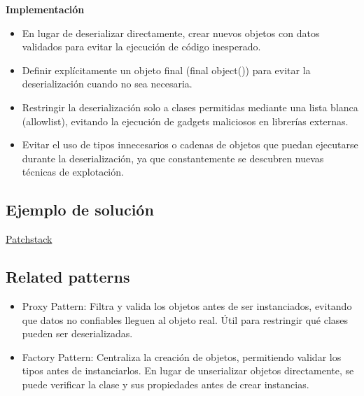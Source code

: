 \textbf{Implementación}
\begin{itemize}
\item En lugar de deserializar directamente, crear nuevos objetos con datos validados para evitar la ejecución de código inesperado.
\item Definir explícitamente un objeto final (final object()) para evitar la deserialización cuando no sea necesaria.
\item Restringir la deserialización solo a clases permitidas mediante una lista blanca (allowlist), evitando la ejecución de gadgets maliciosos en librerías externas.
\item Evitar el uso de tipos innecesarios o cadenas de objetos que puedan ejecutarse durante la deserialización, ya que constantemente se descubren nuevas técnicas de explotación.
\end{itemize}

\subsection{Ejemplo de solución}
\href{https://patchstack.com/academy/wordpress/securing-code/php-object-injection/}{Patchstack}

\subsection{Related patterns}
\begin{itemize}
    \item Proxy Pattern: Filtra y valida los objetos antes de ser instanciados, evitando que datos no confiables lleguen al objeto real. Útil para restringir qué clases pueden ser deserializadas.
    \item Factory Pattern: Centraliza la creación de objetos, permitiendo validar los tipos antes de instanciarlos. En lugar de unserializar objetos directamente, se puede verificar la clase y sus propiedades antes de crear instancias.
\end{itemize}

